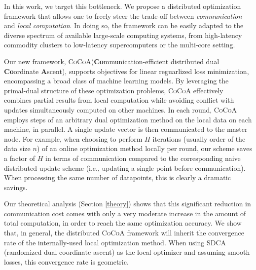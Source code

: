 \documentclass{article} %
\newcommand{\algname}{\textsc{CoCoA}\xspace}  %
\begin{document}
In this work, we target this bottleneck. We propose a distributed optimization framework that allows one to freely steer the trade-off between \emph{communication} and \emph{local computation}. In doing so, the framework can be easily adapted to the diverse spectrum of available large-scale computing systems, from high-latency commodity clusters to low-latency supercomputers or the multi-core setting.

Our new framework, \algname (\textbf{Co}mmunication-efficient distributed dual \textbf{Co}ordinate \textbf{A}scent), supports objectives for linear reguarlized loss minimization, encompassing a broad class of machine learning models. By leveraging the primal-dual structure of these optimization problems, \algname effectively combines partial results from local computation while avoiding conflict with updates simultaneously computed on other machines. %
In each round, \algname employs steps of an arbitrary dual optimization method on the local data on each machine, in parallel. A single update vector is then communicated to the master node.
For example, when choosing to perform $H$ iterations (usually order of the data size $n$) of an online optimization method locally per round, our scheme saves a factor of $H$ in terms of communication compared to the corresponding naive distributed update scheme (i.e., updating a single point before communication). When processing the same number of datapoints, this is clearly a dramatic savings.

Our theoretical analysis (Section \ref{theory}) shows that this significant 
reduction in  communication cost comes with only a very moderate increase 
in the amount of total computation, in order to reach the same optimization 
accuracy. We show that, in general, the distributed \algname framework will inherit the convergence rate of the internally-used local optimization method.
When using SDCA (randomized dual coordinate ascent) as the local optimizer
and assuming smooth losses, this convergence rate is geometric.

\end{document}
